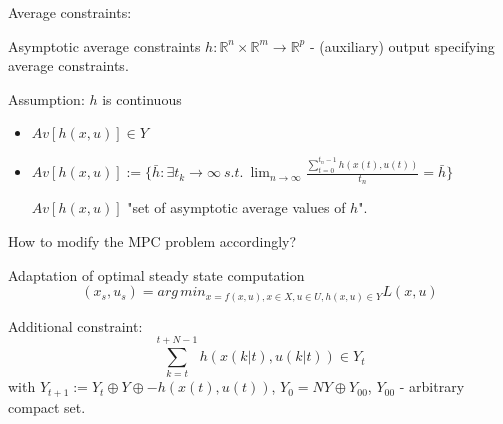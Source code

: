 Average constraints:

\begin{Definition}
Asymptotic average constraints $h: \mathbb{R}^n \times \mathbb{R}^m \to \mathbb{R}^p$ - (auxiliary) output specifying average constraints.
\end{Definition}

Assumption: $h$ is continuous
\begin{itemize}
\item $Av[h(x,u)] \in Y$
\item $Av[h(x,u)] := \{ \bar{h}: \exists {t_k} \to \infty \ s.t. \ \lim_{n \to \infty} \frac{\sum_{t=0}^{t_n - 1}h(x(t),u(t))}{t_n}  = \bar{h}\}$

$Av[h(x,u)]$ "set of asymptotic average values of $h$".
\end{itemize}

How to modify the MPC problem accordingly?

Adaptation of optimal steady state computation
\begin{equation*}
(x_s,u_s) = arg\,min_{x = f(x,u), x \in X, u \in U, h(x,u) \in Y} L(x,u)
\end{equation*}

Additional constraint:
\begin{equation*}
\sum_{k=t}^{t+N-1}h(x(k|t),u(k|t)) \in Y_t
\end{equation*}
with $Y_{t+1} := Y_t \oplus Y \oplus {-h(x(t),u(t))}$, $Y_0 = NY \oplus Y_{00}$, $Y_{00}$ - arbitrary compact set.


